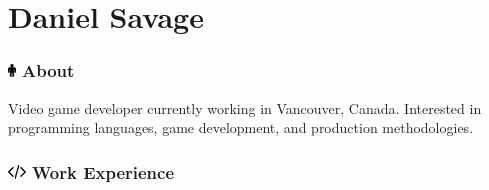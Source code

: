 \documentclass[10pt]{tccv}
\begin{document}
\part{Daniel Savage}

\flafamily

\section{\textcolor{black}{\includegraphics[height=10pt, keepaspectratio=true]{male}} About}

Video game developer currently working in Vancouver, Canada. Interested in programming languages, game development, and production methodologies.

\section{\includegraphics[height=10pt, keepaspectratio=true]{code} Work Experience}
\end{document}
